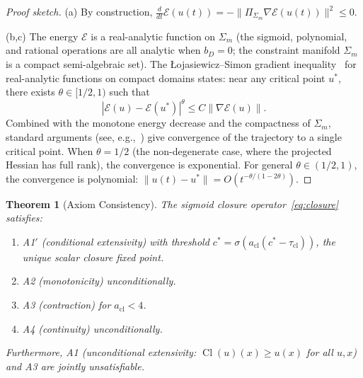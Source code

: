 \documentclass[lettersize,journal]{IEEEtran}
\newtheorem{theorem}{Theorem}
\DeclareMathOperator{\Cl}{Cl}
\begin{document}
\begin{proof}[Proof sketch]
(a) By construction, $\frac{d}{dt}\mathcal{E}(u(t)) = -\|\Pi_{\Sigma_m}\nabla\mathcal{E}(u(t))\|^2 \leq 0$.

(b,c) The energy $\mathcal{E}$ is a real-analytic function on $\Sigma_m$ (the sigmoid, polynomial, and rational operations are all analytic when $b_D = 0$; the constraint manifold $\Sigma_m$ is a compact semi-algebraic set). The \L{}ojasiewicz--Simon gradient inequality~\cite{Lojasiewicz1965,Simon1983} for real-analytic functions on compact domains states: near any critical point $u^*$, there exists $\theta \in [1/2, 1)$ such that
\begin{equation}
|\mathcal{E}(u) - \mathcal{E}(u^*)|^\theta \leq C\|\nabla\mathcal{E}(u)\|.
\end{equation}
Combined with the monotone energy decrease and the compactness of $\Sigma_m$, standard arguments (see, e.g.,~\cite{Chill2003}) give convergence of the trajectory to a single critical point. When $\theta = 1/2$ (the non-degenerate case, where the projected Hessian has full rank), the convergence is exponential. For general $\theta \in (1/2, 1)$, the convergence is polynomial: $\|u(t) - u^*\| = O(t^{-\theta/(1-2\theta)})$.
\end{proof}

\begin{theorem}[Axiom Consistency]
\label{thm:axiom-consistency}
The sigmoid closure operator~\eqref{eq:closure} satisfies:
\begin{enumerate}
\item[(a)] A1$'$ (conditional extensivity) with threshold $c^* = \sigma(a_{\mathrm{cl}}(c^* - \tau_{\mathrm{cl}}))$, the unique scalar closure fixed point.
\item[(b)] A2 (monotonicity) unconditionally.
\item[(c)] A3 (contraction) for $a_{\mathrm{cl}} < 4$.
\item[(d)] A4 (continuity) unconditionally.
\end{enumerate}
Furthermore, A1 (unconditional extensivity: $\Cl(u)(x) \geq u(x)$ for all $u, x$) and A3 are jointly unsatisfiable.
\end{theorem}
\end{document}
